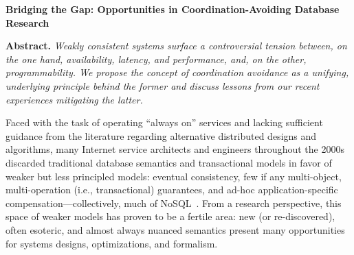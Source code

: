 \documentclass[9pt]{article}
\begin{document}
\thispagestyle{empty}


%

\begin{center}
{\textbf{\large{Bridging the Gap: Opportunities in Coordination-Avoiding Database Research}}}\\[1mm]
{\fontsize{11pt}{12pt}}
\end{center}\vspace{-.5em}


\noindent\textbf{Abstract.} \textit{Weakly consistent systems surface a controversial tension between, on the one hand, availability, latency, and performance, and, on the other, programmability. We propose the concept of coordination avoidance as a unifying, underlying principle behind the former and discuss lessons from our recent experiences mitigating the latter.}

 Faced with the task of operating ``always on'' services and lacking sufficient guidance from the literature regarding alternative distributed designs and algorithms, many Internet service architects and engineers throughout the 2000s discarded traditional database semantics and transactional models in favor of weaker but less principled models: eventual consistency, few if any multi-object, multi-operation (i.e., transactional) guarantees, and ad-hoc application-specific compensation---collectively, much of NoSQL~\cite{queue}. From a research perspective, this space of weaker models has proven to be a fertile area: new (or re-discovered), often esoteric, and almost always nuanced semantics present many opportunities for systems designs, optimizations, and formalism.
\end{document}
